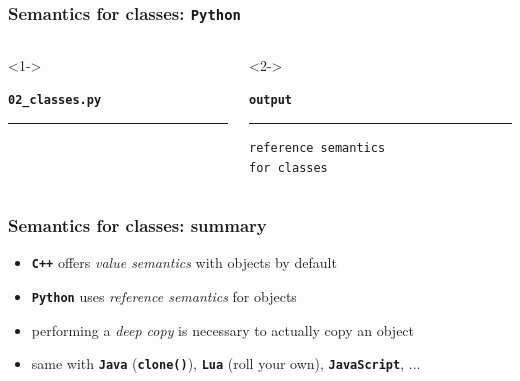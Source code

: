 \documentclass[aspectratio=169]{beamer}
\newcommand{\greenemph}[1]{\textit{\textcolor{clGreen}{#1}}}
\newcommand{\cpp}[1]{\texttt{\textbf{\textcolor{clCodeBlue}{#1}}}}
\begin{document}
\begin{frame}[fragile]
\frametitle{Semantics for classes: \cpp{Python}}
\begin{columns}[T]
  \begin{column}{0.7\textwidth}<1->
    {\color[HTML]{b58900}
    \texttt{\textbf{02\_classes.py}}\vspace{-9pt}
    \rule{\linewidth}{2pt}}%
    {\fontsize{8}{6} }%
    \vspace{-12pt}{\color[HTML]{b58900}\rule{\linewidth}{2pt}}%
  \end{column}
  \begin{column}{0.25\textwidth}<2->
    {\color[HTML]{002b36}
    \texttt{\textbf{output}}\vspace{-9pt}
    \rule{\linewidth}{2pt}}%
    {\fontsize{8}{6} \begin{lstlisting}[showstringspaces=false]
reference semantics
for classes
    \end{lstlisting}
    }
    \vspace{-12pt}{\color[HTML]{002b36}\rule{\linewidth}{2pt}}%
  \end{column}
\end{columns}
\end{frame}

\begin{frame}
\frametitle{Semantics for classes: summary}
\begin{itemize}
  \item{} \cpp{C++} offers \greenemph{value semantics} with objects by default
  \item{} \cpp{Python} uses \greenemph{reference semantics} for objects
  \item{} performing a \greenemph{deep copy} is necessary to actually copy an object
  \item{} same with \cpp{Java} (\cpp{clone()}), \cpp{Lua} (roll your own), \cpp{JavaScript}, ...
\end{itemize}
\end{frame}
\end{document}
